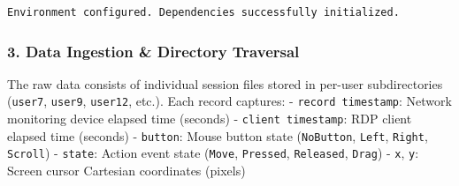 \documentclass[11pt]{article}
\begin{document}
    \begin{Verbatim}[commandchars=\\\{\}]
Environment configured. Dependencies successfully initialized.
    \end{Verbatim}

    \subsubsection{3. Data Ingestion \& Directory
Traversal}\label{data-ingestion-directory-traversal}

The raw data consists of individual session files stored in per-user
subdirectories (\texttt{user7}, \texttt{user9}, \texttt{user12}, etc.).
Each record captures: - \texttt{record\ timestamp}: Network monitoring
device elapsed time (seconds) - \texttt{client\ timestamp}: RDP client
elapsed time (seconds) - \texttt{button}: Mouse button state
(\texttt{NoButton}, \texttt{Left}, \texttt{Right}, \texttt{Scroll}) -
\texttt{state}: Action event state (\texttt{Move}, \texttt{Pressed},
\texttt{Released}, \texttt{Drag}) - \texttt{x}, \texttt{y}: Screen
cursor Cartesian coordinates (pixels)
\end{document}
